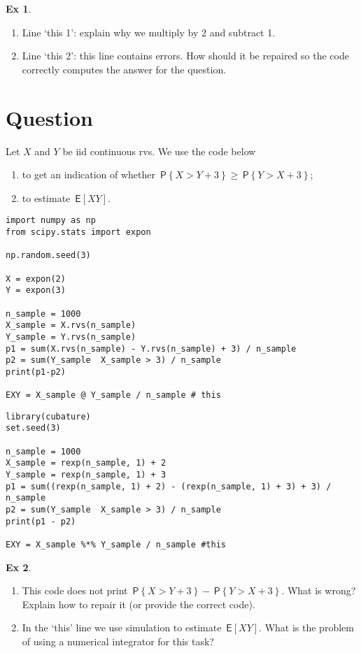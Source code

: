 \documentclass[12pt]{article}
\theoremstyle{definition}
\newtheorem{exercise}{Ex}[section]
\renewcommand{\P}[1]{\,\mathsf{P}\left\{#1\right\}}
\newcommand{\E}[1]{\,\mathsf{E}\left[#1\right]}
\newcommand{\1}[1]{\,I_{#1}} %
\begin{document}
\begin{exercise}
\begin{enumerate}
\item  Line `this 1': explain why we multiply by 2 and subtract 1.
\item Line `this 2': this line contains errors. How should it be repaired so the code correctly computes the answer for the question.
\end{enumerate}
\end{exercise}

\section{Question}

Let $X$ and $Y$ be iid continuous rvs. We use the code below
\begin{enumerate}
\item to get an indication of whether $\P{X>Y+3} \geq \P{Y>X+3}$;
\item to estimate $\E{XY}$.
\end{enumerate}

\begin{verbatim}
import numpy as np
from scipy.stats import expon

np.random.seed(3)

X = expon(2)
Y = expon(3)

n_sample = 1000
X_sample = X.rvs(n_sample)
Y_sample = Y.rvs(n_sample)
p1 = sum(X.rvs(n_sample) - Y.rvs(n_sample) + 3) / n_sample
p2 = sum(Y_sample  X_sample > 3) / n_sample
print(p1-p2)

EXY = X_sample @ Y_sample / n_sample # this
\end{verbatim}

\begin{verbatim}
library(cubature)
set.seed(3)

n_sample = 1000
X_sample = rexp(n_sample, 1) + 2
Y_sample = rexp(n_sample, 1) + 3
p1 = sum((rexp(n_sample, 1) + 2) - (rexp(n_sample, 1) + 3) + 3) / n_sample
p2 = sum(Y_sample  X_sample > 3) / n_sample
print(p1 - p2)

EXY = X_sample %*% Y_sample / n_sample #this
\end{verbatim}


\begin{exercise}
\begin{enumerate}
\item This code does not print $\P{X>Y+3} - \P{Y>X+3}$. What is wrong? Explain how to repair it (or provide the correct code).
\item  In the `this' line we use simulation to estimate $\E{XY}$. What is the problem of using  a numerical integrator for  this task?
\end{enumerate}
\end{exercise}
\end{document}
